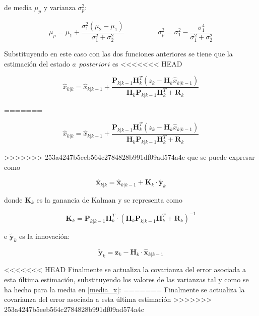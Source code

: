 \documentclass[twoside,11pt]{report}
\begin{document}
de media $\mu_{p}$ y varianza $\sigma^{2}_{p}$:

\begin{equation}
\mu_{p}=\mu_{1}+\frac{\sigma^{2}_{1}(\mu_{2}-\mu_{1})}{\sigma^{2}_{1}+\sigma^{2}_{2}} \hspace{2cm} \sigma^{2}_{p} = \sigma^{2}_{1} - \frac{\sigma^{4}_{1}}{\sigma^{2}_{1} + \sigma^{2}_{2}} 
\end{equation}	

Substituyendo en este caso con las dos funciones anteriores se tiene que la estimación del estado $a \>\> posteriori$ es 
<<<<<<< HEAD

\begin{equation}
\hat{x}_{k|k}=\hat{x}_{k|k-1} + \frac{\mathbf{P}_{k|k-1}\mathbf{H}^{T}_{k}(z_{k}-\mathbf{H}_{k}\hat{x}_{k|k-1})}{\mathbf{H}_{k} \mathbf{P}_{k|k-1} \mathbf{H}_{k}^{T} + \mathbf{R}_{k}}
\label{media_x}
\end{equation}

=======

\begin{equation}
\hat{x}_{k|k}=\hat{x}_{k|k-1} + \frac{\mathbf{P}_{k|k-1}\mathbf{H}^{T}_{k}(z_{k}-\mathbf{H}_{k}\hat{x}_{k|k-1})}{\mathbf{H}_{k} \mathbf{P}_{k|k-1} \mathbf{H}_{k}^{T} + \mathbf{R}_{k}}
\end{equation}

>>>>>>> 253a4247b5eeb564c2784828b991df09ad574a4c
que se puede expresar como

\begin{equation}
\hat{\mathbf{x}}_{k|k}=\hat{\mathbf{x}}_{k|k-1}+\mathbf{K}_{k}\cdot \tilde{\mathbf{y}}_{k}
\end{equation}

donde $\mathbf{K}_{k}$ es la ganancia de Kalman y se representa como

\begin{equation}
\mathbf{K}_{k}=\mathbf{P}_{k|k-1} \mathbf{H}_{k}^{T} \cdot (\mathbf{H}_{k} \mathbf{P}_{k|k-1} \mathbf{H}_{k}^{T} + \mathbf{R}_{k})^{-1}
\end{equation}

e $\tilde{\mathbf{y}}_{k}$ es la innovación:

\begin{equation}
\tilde{\mathbf{y}}_{k} = \mathbf{z}_{k} - \mathbf{H}_{k} \cdot \hat{\mathbf{x}}_{k|k-1}
\end{equation}

<<<<<<< HEAD
Finalmente se actualiza la covarianza del error asociada a esta última estimación, substituyendo los valores de las varianzas tal y como se ha hecho para la media en \ref{media_x}:
=======
Finalmente se actualiza la covarianza del error asociada a esta última estimación
>>>>>>> 253a4247b5eeb564c2784828b991df09ad574a4c
\end{document}
